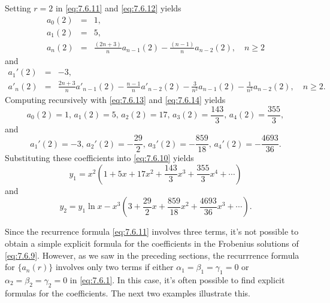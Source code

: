 \documentclass{ximera}
\begin{document}
\begin{example}
\begin{explanation}
Setting $r=2$ in \eqref{eq:7.6.11} and \eqref{eq:7.6.12} yields
\begin{equation} \label{eq:7.6.13}
\begin{array}{ccl}
a_0(2)&=&1,\\
a_1(2)&=&5,\\
a_n(2)&=&\frac{(2n+3)}{n}
a_{n-1}(2)-\frac{(n-1)}{n}a_{n-2}(2),\quad n\geq 2
\end{array}
\end{equation}
and
\begin{equation} \label{eq:7.6.14}
\begin{array}{ccl}
a_1'(2)&=&-3,\\
a'_n(2)&=&\frac{2n+3}{n}a'_{n-1}(2)-\frac{n-1}{n}a'_{n-2}(2)
-\frac{3}{n^2}a_{n-1}(2)-\frac{1}{n^2}a_{n-2}(2),\quad n\geq 2.
\end{array}
\end{equation}
Computing recursively with  \eqref{eq:7.6.13} and \eqref{eq:7.6.14}
yields
$$
a_0(2)=1,\,a_1(2)=5,\,a_2(2)=17,\,a_3(2)=\frac{143}{3},\,a_4(2)=\frac{355}{3},
$$
and
$$
a_1'(2)=-3,\,a_2'(2)=-\frac{29}{2},\,a_3'(2)=-\frac{859}{18},
\,a_4'(2)=-\frac{4693}{36}.
$$
Substituting these coefficients into \eqref{eq:7.6.10} yields
$$
y_1=x^2\left(1+5x+17x^2+\frac{143}{3}x^3
+\frac{355}{3}x^4+\cdots\right)
$$
and
$$
y_2=y_1 \ln x
-x^3\left(3+\frac{29}{2}x+\frac{859}{18}x^2+\frac{4693}{36}x^3
+\cdots\right).
$$
\end{explanation}
\end{example}

Since the recurrence formula \eqref{eq:7.6.11} involves three terms, it's
not possible to obtain a simple explicit formula for the coefficients
in the Frobenius solutions of \eqref{eq:7.6.9}. However, as we saw in the
preceding sections, the recurrrence formula for $\{a_n(r)\}$ involves
only two terms if either $\alpha_1=\beta_1=\gamma_1=0$ or
$\alpha_2=\beta_2=\gamma_2=0$ in \eqref{eq:7.6.1}. In this case, it's
often
possible to find explicit formulas for the coefficients. The next two
examples illustrate this.
\end{document}
